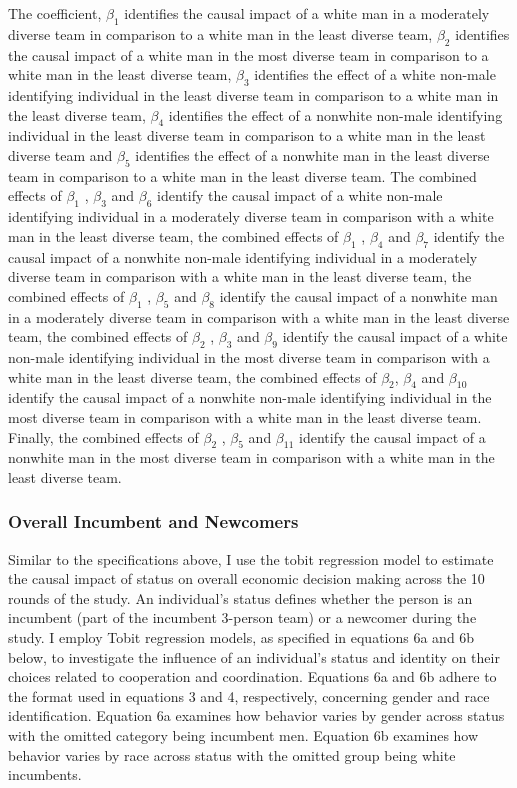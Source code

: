 \hspace  *{0mm} The coefficient, $\beta_1$ identifies the causal impact of a white man in a moderately diverse team in comparison to a white man in the least diverse team, $\beta_2$ identifies the causal impact of a white man in the most diverse team in comparison to a white man in the least diverse team, $\beta_3$ identifies the effect of a white non-male identifying individual in the least diverse team in comparison to a white man in the least diverse team, $\beta_4$ identifies the effect of a nonwhite non-male identifying individual in the least diverse team in comparison to a white man in the least diverse team and $\beta_5$ identifies the effect of a nonwhite man in the least diverse team in comparison to a white man in the least diverse team. The combined effects of $\beta_1$ , $\beta_3$ and $\beta_6$ identify the causal impact of a white non-male identifying individual in a moderately diverse team in comparison with a white man in the least diverse team, the combined effects of $\beta_1$ , $\beta_4$ and $\beta_7$ identify the causal impact of a nonwhite non-male identifying individual in a moderately diverse team in comparison with a white man in the least diverse team, the combined effects of $\beta_1$ , $\beta_5$ and $\beta_8$ identify the causal impact of a nonwhite man in a moderately diverse team in comparison with a white man in the least diverse team, the combined effects of $\beta_2$ , $\beta_3$ and $\beta_9$ identify the causal impact of a white non-male identifying individual in the most diverse team in comparison with a white man in the least diverse team, the combined effects of $\beta_2$, $\beta_4$ and $\beta_{10}$ identify the causal impact of a nonwhite non-male identifying individual in the most diverse team in comparison with a white man in the least diverse team. Finally, the combined effects of $\beta_2$ , $\beta_5$ and $\beta_{11}$ identify the causal impact of a nonwhite man in the most diverse team in comparison with a white man in the least diverse team. 

\subsubsection{Overall Incumbent and Newcomers}
Similar to the specifications above, I use the tobit regression model to estimate the causal impact of status on overall economic decision making across the 10 rounds of the study. An individual's status defines whether the person is an incumbent (part of the incumbent 3-person team) or a newcomer during the study. I employ Tobit regression models, as specified in equations 6a and 6b below, to investigate the influence of an individual's status and identity on their choices related to cooperation and coordination. Equations 6a and 6b adhere to the format used in equations 3 and 4, respectively, concerning gender and race identification. Equation 6a examines how behavior varies by gender across status with the omitted category being incumbent men. Equation 6b examines how behavior varies by race across status with the omitted group being white incumbents.

